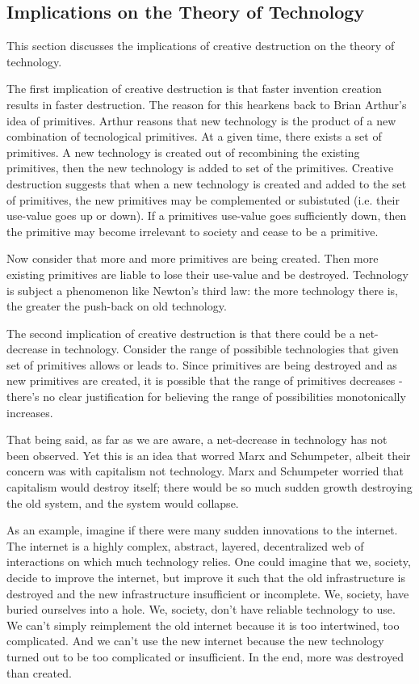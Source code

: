 \documentclass[11pt]{article}
\begin{document}
\subsection{Implications on the Theory of Technology}
This section discusses the implications of creative destruction on the theory of technology.

The first implication of creative destruction is that faster invention creation results in faster destruction.
The reason for this hearkens back to Brian Arthur's idea of primitives. 
Arthur reasons that new technology is the product of a new combination of tecnological primitives. 
At a given time, there exists a set of primitives. 
A new technology is created out of recombining the existing primitives, then the new technology is added to set of the primitives.
Creative destruction suggests that when a new technology is created and added to the set of primitives, the new primitives may be complemented or subistuted (i.e. their use-value goes up or down).
If a primitives use-value goes sufficiently down, then the primitive may become irrelevant to society and cease to be a primitive.

Now consider that more and more primitives are being created. 
Then more existing primitives are liable to lose their use-value and be destroyed.
Technology is subject a phenomenon like Newton's third law: the more technology there is, the greater the push-back on old technology. 

The second implication of creative destruction is that there could be a net-decrease in technology. 
Consider the range of possibible technologies that given set of primitives allows or leads to.
Since primitives are being destroyed and as new primitives are created, it is possible that the range of primitives decreases - there's no clear justification for believing the range of possibilities monotonically increases.

That being said, as far as we are aware, a net-decrease in technology has not been observed.
Yet this is an idea that worred Marx and Schumpeter, albeit their concern was with capitalism not technology.
Marx and Schumpeter worried that capitalism would destroy itself; there would be so much sudden growth destroying the old system, and the system would collapse.

As an example, imagine if there were many sudden innovations to the internet.
The internet is a highly complex, abstract, layered, decentralized web of interactions on which much technology relies.
One could imagine that we, society, decide to improve the internet, but improve it such that the old infrastructure is destroyed and the new infrastructure insufficient or incomplete.
We, society, have buried ourselves into a hole.
We, society, don't have reliable technology to use. 
We can't simply reimplement the old internet because it is too intertwined, too complicated.
And we can't use the new internet because the new technology turned out to be too complicated or insufficient.
In the end, more was destroyed than created.
\end{document}
